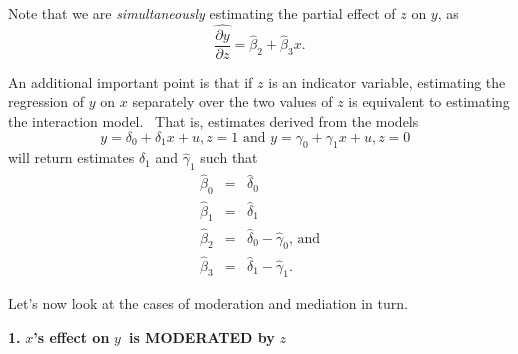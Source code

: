 \documentclass[11pt]{article}
\begin{document}
Note that we are \textit{simultaneously} estimating the partial effect of $z$
on $y$, as%
\begin{equation*}
\widehat{\frac{\partial y}{\partial z}}=\widehat{\beta }_{2}+\widehat{\beta }%
_{3}x.
\end{equation*}

\bigskip An additional important point is that if $z$ is an indicator
variable, estimating the regression of $y$ on $x$ separately over the two
values of $z$ is equivalent to estimating the interaction model. \ That is,
estimates derived from the models 
\begin{equation*}
y=\delta _{0}+\delta _{1}x+u,z=1\text{ \ and \ }y=\gamma _{0}+\gamma
_{1}x+u,z=0\text{ }
\end{equation*}
will return estimates $\widehat{\delta }_{1}$ and $\widehat{\gamma }_{1}$
such that 
\begin{eqnarray*}
\widehat{\beta }_{0} &=&\widehat{\delta }_{0} \\
\widehat{\beta }_{1} &=&\widehat{\delta }_{1} \\
\widehat{\beta }_{2} &=&\widehat{\delta }_{0}-\widehat{\gamma }_{0}\text{,
and} \\
\widehat{\beta }_{3} &=&\widehat{\delta }_{1}-\widehat{\gamma }_{1}\text{. }
\end{eqnarray*}

Let's now look at the cases of moderation and mediation in turn.\bigskip

\pagebreak \textbf{1. }$x$\textbf{'s effect on }$y$\textbf{\ is MODERATED by 
}$z$

\end{document}
